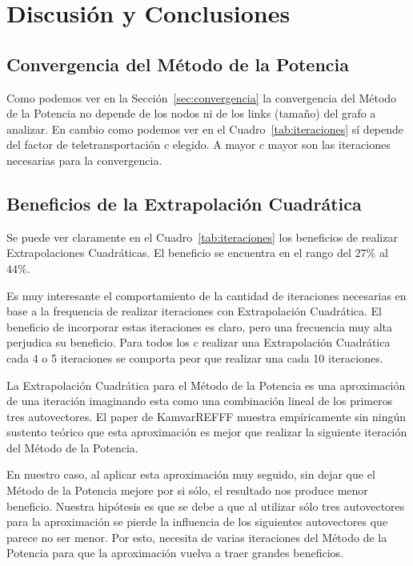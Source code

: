 \section{Discusión y Conclusiones}

\subsection{Convergencia del Método de la Potencia}

Como podemos ver en la Sección~\ref{sec:convergencia} la convergencia del
Método de la Potencia no depende de los nodos ni de los links (tamaño) del
grafo a analizar. En cambio como podemos ver en el Cuadro~\ref{tab:iteraciones}
sí depende del factor de teletransportación $c$ elegido. A mayor $c$ mayor son
las iteraciones necesarias para la convergencia.

\subsection{Beneficios de la Extrapolación Cuadrática}

Se puede ver claramente en el Cuadro~\ref{tab:iteraciones} los beneficios de
realizar Extrapolaciones Cuadráticas. El beneficio se encuentra en el rango del
$27\%$ al $44\%$.

Es muy interesante el comportamiento de la cantidad de iteraciones necesarias
en base a la frequencia de realizar iteraciones con Extrapolación Cuadrática.
El beneficio de incorporar estas iteraciones es claro, pero una frecuencia muy
alta perjudica su beneficio. Para todos los $c$ realizar una Extrapolación
Cuadrática cada 4 o 5 iteraciones se comporta peor que realizar una cada 10
iteraciones.

La Extrapolación Cuadrática para el Método de la Potencia es una aproximación
de una iteración imaginando esta como una combinación lineal de los primeros
tres autovectores. El paper de KamvarREFFF muestra empíricamente sin ningún
sustento teórico que esta aproximación es mejor que realizar la siguiente
iteración del Método de la Potencia.

En nuestro caso, al aplicar esta aproximación muy seguido, sin dejar que el
Método de la Potencia mejore por si sólo, el resultado nos produce menor
beneficio. Nuestra hipótesis es que se debe a que al utilizar sólo tres
autovectores para la aproximación se pierde la influencia de los siguientes
autovectores que parece no ser menor. Por esto, necesita de varias iteraciones
del Método de la Potencia para que la aproximación vuelva a traer grandes
beneficios.

